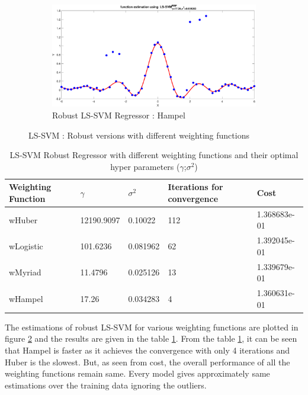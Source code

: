 \begin{figure}[!ht]
\begin{subfigure}{.35\textwidth}
		\includegraphics[height=.65\linewidth, width=0.9\linewidth]{Exercise2/Report/robust_hampel}
		\caption{Robust LS-SVM Regressor : Hampel}
		\label{fig:rob_hampel}
	\end{subfigure}
	\caption{LS-SVM : Robust versions with different weighting functions}
	\label{fig:robust_versions}
\end{figure}
\begin{table}[!htpb]
	\centering
	\begin{tabular}{ |p{4.5cm}||p{2.5cm}||p{2.5cm}||p{2.5cm}||p{2.5cm}|}
		\hline
		\cellcolor{blue!25} Weighting Function &\cellcolor{blue!25}$\gamma$ &\cellcolor{blue!25}$\sigma^2$ & \cellcolor{blue!25} Iterations for convergence & \cellcolor{blue!25} Cost \\ \hline
		\cellcolor{blue!25} wHuber  &12190.9097 & 0.10022 & 112 & 1.368683e-01 \\ \hline
		\cellcolor{blue!25} wLogistic &101.6236 & 0.081962 & 62&1.392045e-01  \\ \hline
		\cellcolor{blue!25} wMyriad & 11.4796&0.025126 & 13& 1.339679e-01 \\ \hline
		\cellcolor{blue!25} wHampel & 17.26 & 0.034283 & 4 & 1.360631e-01 \\ \hline
	\end{tabular}
	\caption{LS-SVM Robust Regressor with different weighting functions and their optimal hyper parameters ($\gamma$;$\sigma^2$)}
	\label{table:11}
\end{table}

The estimations of robust LS-SVM for various weighting functions are plotted in figure \ref{fig:robust_versions} and the results are given in the table \ref{table:11}. From the table \ref{table:11}, it can be seen that Hampel is faster as it achieves the convergence with only 4 iterations and Huber is the slowest. But, as seen from cost, the overall performance of all the weighting functions remain same. Every model gives approximately same estimations over the training data ignoring the outliers.
